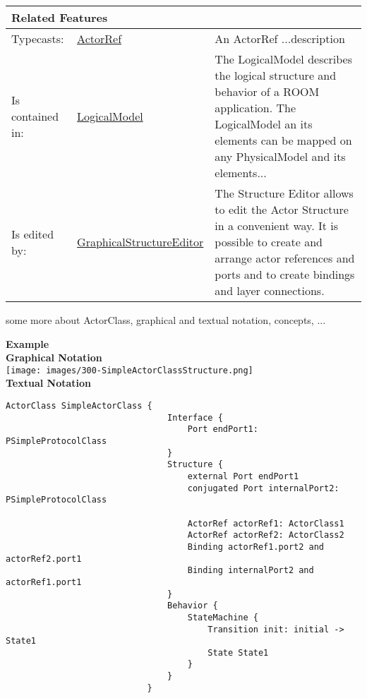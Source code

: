 			\vspace{\baselineskip}
			\begingroup
			\renewcommand{\arraystretch}{1.8} %
			\parbox{\textwidth}{
			\begin{longtable}{l l p{}}
				\multicolumn{2}{l}{\textbf{\large Related Features}} & \\
				\hline
			Typecasts: & \tabitem \hyperlink{ref:ActorRef}{ActorRef}  & An ActorRef ...description\\
			\hline
			Is contained in: & \tabitem \hyperlink{ref:LogicalModel}{LogicalModel}  & The LogicalModel describes the logical structure and behavior of a ROOM application. The LogicalModel an its elements can be mapped on any PhysicalModel and its elements...\\
			\hline
			Is edited by: & \tabitem \hyperlink{ref:GraphicalStructureEditor}{GraphicalStructureEditor}  & The Structure Editor allows to edit the Actor Structure in a convenient way. It is possible to create and arrange actor references and ports and to create bindings and layer connections.\\
			\hline
			\end{longtable}	
			}
			\endgroup
			\vspace{\baselineskip}
			
			some more about ActorClass, graphical and textual notation, concepts, ...
			
			
						\textbf{Example}
						\\
						\textbf{Graphical Notation}
						\\
							\texttt{[image: images/300-SimpleActorClassStructure.png]}
						\\
						\textbf{Textual Notation}
						\\
							\begin{lstlisting}[language=ROOM]
							ActorClass SimpleActorClass {
								Interface {
									Port endPort1: PSimpleProtocolClass
								}
								Structure {
									external Port endPort1
									conjugated Port internalPort2: PSimpleProtocolClass
			
									ActorRef actorRef1: ActorClass1
									ActorRef actorRef2: ActorClass2
									Binding actorRef1.port2 and actorRef2.port1
									Binding internalPort2 and actorRef1.port1
								}
								Behavior {
									StateMachine {
										Transition init: initial -> State1
										State State1
									}
								}
							}
							\end{lstlisting}
		
